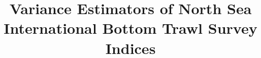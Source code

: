 \documentclass[a4paper 12pt]{article}
\title{\bf 
}
\author{}
\date{}
\numberwithin{equation}{section}
\begin{document}
\title{Variance Estimators of North Sea International Bottom Trawl Survey Indices}

\maketitle


\begin{abstract}

\end{abstract}
\end{document}
